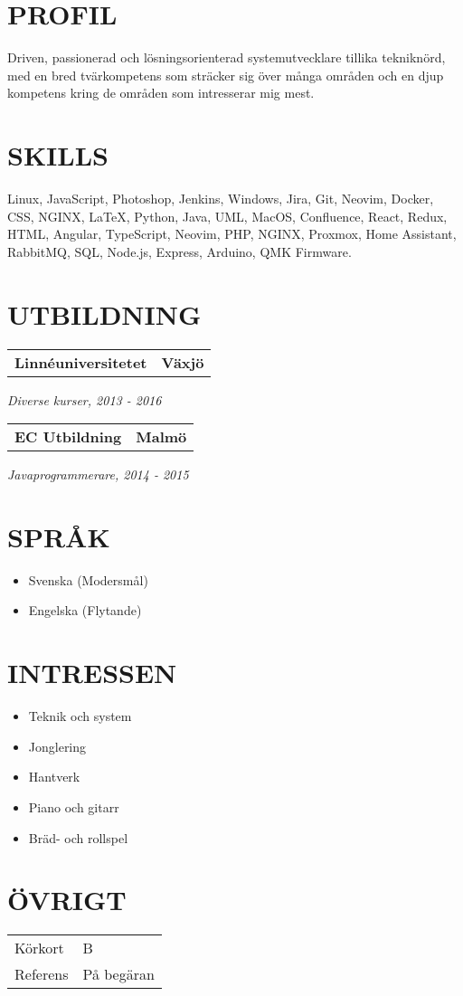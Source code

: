 \documentclass[11pt,a4paper]{moderncv}
\newcommand*{\educationentry}[4][0.5mm]{
    \begin{tabularx}{\textwidth}{LR}
        {\bfseries #3} & {\bfseries #4} \\
    \end{tabularx}
    {\itshape #2}
    \par\addvspace{#1}
}
\begin{document}
\hfill
\begin{minipage}[t]{0.35\textwidth}
\section{PROFIL}
Driven, passionerad och lösningsorienterad systemutvecklare tillika tekniknörd, med en bred tvärkompetens som sträcker sig över många områden och en djup kompetens kring de områden som intresserar mig mest.

\section{SKILLS}
Linux, JavaScript, Photoshop, Jenkins, Windows, Jira, Git, Neovim, Docker, CSS, NGINX, \LaTeX, Python, Java, UML, MacOS, Confluence, React, Redux, HTML, Angular, TypeScript, Neovim, PHP, NGINX, Proxmox, Home Assistant, RabbitMQ, SQL, Node.js, Express, Arduino, QMK Firmware.

\section{UTBILDNING}
\educationentry{Diverse kurser, 2013 - 2016}{Linnéuniversitetet}{Växjö}
\educationentry{Javaprogrammerare, 2014 - 2015}{EC Utbildning}{Malmö}

\section{SPRÅK}
\begin{itemize}
    \item Svenska (Modersmål)
    \item Engelska (Flytande)
\end{itemize}

\section{INTRESSEN}
\begin{itemize}
    \item Teknik och system
    \item Jonglering
    \item Hantverk
    \item Piano och gitarr
    \item Bräd- och rollspel
\end{itemize}

\section{ÖVRIGT}
\begin{tabularx}{\textwidth}{L L}
  Körkort & B \\
  Referens & På begäran

\end{tabularx}

\end{minipage}
\end{document}
